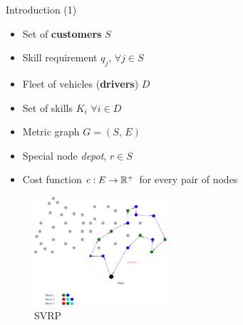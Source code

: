 \begin{frame}[t]{Introduction (1)}
    \begin{minipage}[t]{0.48\textwidth}
        \begin{itemize}
            \item Set of \textbf{customers} $S$
            \item Skill requirement $q_j$,  $\forall j \in S$
            \item Fleet of vehicles (\textbf{drivers}) $D$
            \item Set of skills $K_i$ $\forall i \in D$
            \item Metric graph $G = (S, \, E)$
            \item Special node \emph{depot}, $r \in S$
            \item Cost function $c:E \rightarrow \mathbb{R}^+$ for every pair of nodes
        \end{itemize}
    \end{minipage}
    \begin{minipage}[t]{0.48\textwidth}
        \begin{figure}
            \centering
            \includegraphics[width=5cm]{VRPSS03.pdf}
            \caption{SVRP}
            \label{fig:VRPSS02}
        \end{figure}            
    \end{minipage}    
\end{frame}

